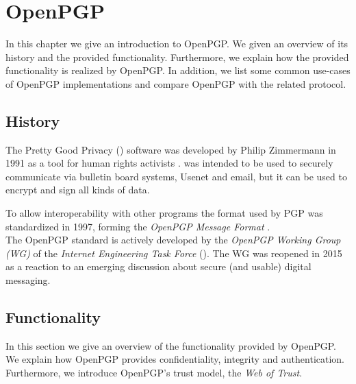\chapter{OpenPGP} \label{chapter:openpgp}

In this chapter we give an introduction to OpenPGP. We given an overview of its history and the provided functionality. Furthermore, we explain how the provided functionality is realized by OpenPGP. In addition, we list some common use-cases of OpenPGP implementations and compare OpenPGP with the related  protocol. 


\section{History}  \label{section:openpgp:history}



The Pretty Good Privacy () software was developed by Philip Zimmermann in 1991 \cite{PGP1} as a tool for human rights activists \cite{PGP2}.  was intended to be used to securely communicate via bulletin board systems, Usenet and email, but it can be used to encrypt and sign all kinds of data.

To allow interoperability with other programs the format used by PGP was standardized in 1997, forming the \textit{OpenPGP Message Format} \cite{RFC4880}. \\


The OpenPGP standard is actively developed by the \textit{OpenPGP Working Group (WG)} of the \textit{Internet Engineering Task Force} (). The WG was reopened in 2015 as a reaction to an emerging discussion about secure (and usable) digital messaging.

\section{Functionality} \label{section:openpgp:functionality}

In this section we give an overview of the functionality provided by OpenPGP. We explain how OpenPGP provides confidentiality, integrity and authentication. Furthermore, we introduce OpenPGP's trust model, the \textit{Web of Trust}.  \\


